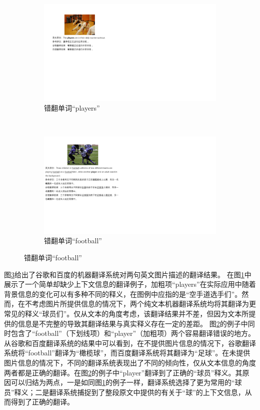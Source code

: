 \begin{figure}[!htbp]
    \centering
    \begin{subfigure}[b]{1\linewidth}
      \centering
      \includegraphics{Img/fig_1_case_players.pdf}
      \caption{错翻单词“players”}
      \label{fig:1_players}
    \end{subfigure}%
    \\
    \begin{subfigure}[b]{\linewidth}
      \centering
      \includegraphics{Img/fig_1_case_football.pdf}
      \caption{错翻单词“football”}
      \label{fig:1_football}
    \end{subfigure}
    \label{fig:1_translation_cases}
\end{figure}
图\ref{fig:1_translation_cases}给出了谷歌和百度的机器翻译系统对两句英文图片描述的翻译结果。
在图\ref{fig:1_players}中展示了一个简单却缺少上下文信息的翻译例子，加粗项“players”在实际应用中随着背景信息的变化可以有多种不同的释义，在图例中应指的是“空手道选手们”。然而，在不考虑图片所提供信息的情况下，两个纯文本机器翻译系统均将其翻译为更常见的释义“球员们”。仅从文本的角度考虑，该翻译结果并不差，但因为文本所提供的信息是不完整的导致其翻译结果与真实释义存在一定的差距。
图\ref{fig:1_football}的例子中同时包含了“football”（下划线项）和“player”（加粗项）两个容易翻译错误的地方。从谷歌和百度翻译系统的结果中可以看到，在不提供图片信息的情况下，谷歌翻译系统将“football”翻译为“橄榄球”，而百度翻译系统将其翻译为“足球”。在未提供图片信息的情况下，不同的翻译系统表现出了不同的倾向性，仅从文本信息的角度两者都是正确的翻译。在图\ref{fig:1_football}的例子中“player”翻译到了正确的“球员”释义。其原因可以归结为两点，一是如同图\ref{fig:1_players}的例子一样，翻译系统选择了更为常用的“球员”释义；二是翻译系统捕捉到了整段原文中提供的有关于“球”的上下文信息，从而得到了正确的翻译。


